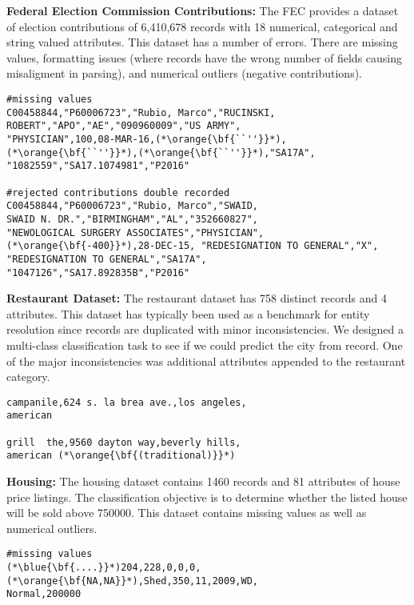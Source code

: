 \vspace{0.5em}\noindent\textbf{Federal Election Commission Contributions: } The FEC provides a dataset of election contributions of 6,410,678 records with 18 numerical, categorical and string valued attributes. This dataset has a number of errors. There are missing values, formatting issues (where records have the wrong number of fields causing misaligment in parsing), and numerical outliers (negative contributions).

\begin{lstlisting}
#missing values
C00458844,"P60006723","Rubio, Marco","RUCINSKI,
ROBERT","APO","AE","090960009","US ARMY",
"PHYSICIAN",100,08-MAR-16,(*\orange{\bf{``''}}*),(*\orange{\bf{``''}}*),(*\orange{\bf{``''}}*),"SA17A",
"1082559","SA17.1074981","P2016"

#rejected contributions double recorded
C00458844,"P60006723","Rubio, Marco","SWAID, 
SWAID N. DR.","BIRMINGHAM","AL","352660827",
"NEWOLOGICAL SURGERY ASSOCIATES","PHYSICIAN",
(*\orange{\bf{-400}}*),28-DEC-15, "REDESIGNATION TO GENERAL","X",
"REDESIGNATION TO GENERAL","SA17A",
"1047126","SA17.892835B","P2016"
\end{lstlisting}

\vspace{0.5em}\noindent\textbf{Restaurant Dataset: } The restaurant dataset has 758 distinct records and 4 attributes. This dataset has typically been used as a benchmark for entity resolution since records are duplicated with minor inconsistencies.
We designed a multi-class classification task to see if we could predict the city from record.
One of the major inconsistencies was additional attributes appended to the restaurant category.

\begin{lstlisting}
campanile,624 s. la brea ave.,los angeles,
american

grill  the,9560 dayton way,beverly hills,
american (*\orange{\bf{(traditional)}}*)
\end{lstlisting}


\vspace{0.5em}\noindent\textbf{Housing: } The housing dataset contains 1460 records and 81 attributes of house price listings. The classification objective is to determine whether the listed house will be sold above 750000. 
This dataset contains missing values as well as numerical outliers.

\begin{lstlisting}
#missing values
(*\blue{\bf{....}}*)204,228,0,0,0,(*\orange{\bf{NA,NA}}*),Shed,350,11,2009,WD,
Normal,200000
\end{lstlisting}